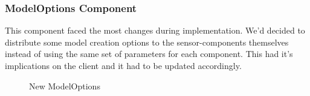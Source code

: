 \subsubsection{ModelOptions Component}
This component faced the most changes during implementation. We'd decided to distribute some model creation options to the sensor-components themselves instead of using the same set of parameters for each component. This had it's implications on the client and it had to be updated accordingly.

\begin{figure}[ht]
    \centering
    \caption{New ModelOptions}
\end{figure}

